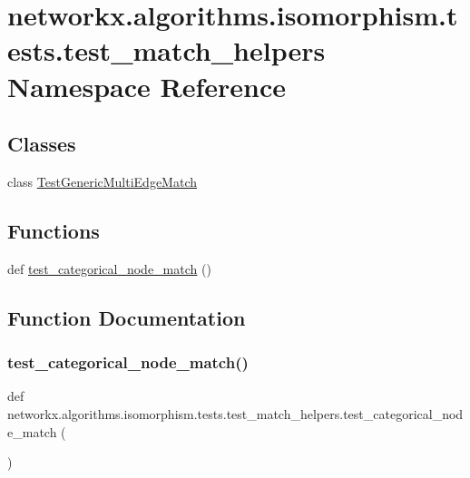 \hypertarget{namespacenetworkx_1_1algorithms_1_1isomorphism_1_1tests_1_1test__match__helpers}{}\section{networkx.\+algorithms.\+isomorphism.\+tests.\+test\+\_\+match\+\_\+helpers Namespace Reference}
\label{namespacenetworkx_1_1algorithms_1_1isomorphism_1_1tests_1_1test__match__helpers}
\subsection*{Classes}
\begin{DoxyCompactItemize}
\item 
class \hyperlink{classnetworkx_1_1algorithms_1_1isomorphism_1_1tests_1_1test__match__helpers_1_1TestGenericMultiEdgeMatch}{Test\+Generic\+Multi\+Edge\+Match}
\end{DoxyCompactItemize}
\subsection*{Functions}
\begin{DoxyCompactItemize}
\item 
def \hyperlink{namespacenetworkx_1_1algorithms_1_1isomorphism_1_1tests_1_1test__match__helpers_a18ad296710c2a97e13d9cc7491bbbfa6}{test\+\_\+categorical\+\_\+node\+\_\+match} ()
\end{DoxyCompactItemize}


\subsection{Function Documentation}
\mbox{\label{namespacenetworkx_1_1algorithms_1_1isomorphism_1_1tests_1_1test__match__helpers_a18ad296710c2a97e13d9cc7491bbbfa6}} 
\subsubsection{\texorpdfstring{test\+\_\+categorical\+\_\+node\+\_\+match()}{test\_categorical\_node\_match()}}
{\footnotesize\ttfamily def networkx.\+algorithms.\+isomorphism.\+tests.\+test\+\_\+match\+\_\+helpers.\+test\+\_\+categorical\+\_\+node\+\_\+match (\begin{DoxyParamCaption}{ }\end{DoxyParamCaption})}


